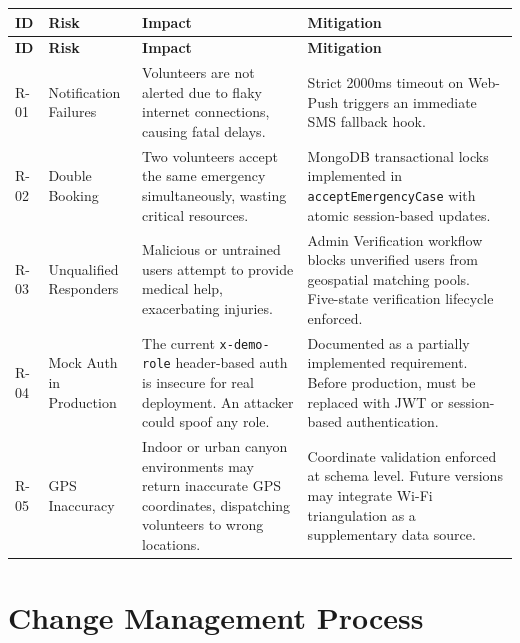 \documentclass[12pt,a4paper]{article}
\begin{document}
\begin{longtable}{|p{1cm}|p{2.8cm}|p{4.5cm}|p{5cm}|}
\hline
\rowcolor{lightorange}
\textbf{ID} & \textbf{Risk} & \textbf{Impact} & \textbf{Mitigation} \\
\hline
\endfirsthead
\hline
\rowcolor{lightorange}
\textbf{ID} & \textbf{Risk} & \textbf{Impact} & \textbf{Mitigation} \\
\hline
\endhead

R-01 & Notification Failures &
Volunteers are not alerted due to flaky internet connections, causing fatal delays. &
Strict 2000ms timeout on Web-Push triggers an immediate SMS fallback hook. \\
\hline

R-02 & Double Booking &
Two volunteers accept the same emergency simultaneously, wasting critical resources. &
MongoDB transactional locks implemented in \texttt{acceptEmergencyCase} with atomic session-based updates. \\
\hline

R-03 & Unqualified Responders &
Malicious or untrained users attempt to provide medical help, exacerbating injuries. &
Admin Verification workflow blocks unverified users from geospatial matching pools. Five-state verification lifecycle enforced. \\
\hline

R-04 & Mock Auth in Production &
The current \texttt{x-demo-role} header-based auth is insecure for real deployment. An attacker could spoof any role. &
Documented as a partially implemented requirement. Before production, must be replaced with JWT or session-based authentication. \\
\hline

R-05 & GPS Inaccuracy &
Indoor or urban canyon environments may return inaccurate GPS coordinates, dispatching volunteers to wrong locations. &
Coordinate validation enforced at schema level. Future versions may integrate Wi-Fi triangulation as a supplementary data source. \\
\hline

\end{longtable}

\section{Change Management Process}
\end{document}
